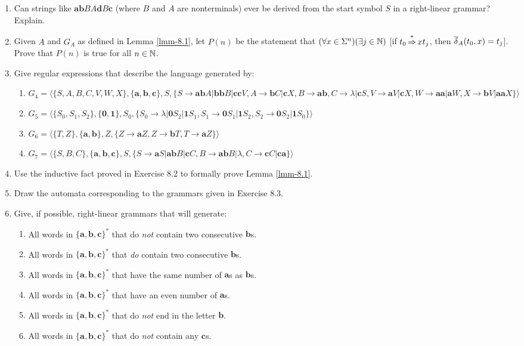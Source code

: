 \begin{enumerate}[{8.}1. ]
\item Can strings like $\pmb{ab}BA\pmb{d}B\pmb{c}$ (where $B$ and $A$ are nonterminals)
ever be derived from the start symbol $S$ in a right-linear grammar? Explain.

\item Given $A$ and $G_A$ as defined in Lemma \ref{lmm-8.1}, let $P(n)$ be the statement
that $(\forall x\in\Sigma^n)(\exists j\in\mathbb{N})$ [if $t_0\operatorname{\overset{*}{\Rightarrow}} xt_j$, then
$\overline{\delta}_A(t_0,x)=t_j$]. Prove that $P(n)$ is true for all $n\in\mathbb{N}$.

\item Give regular expressions that describe the language generated by:
\begin{enumerate}
\item $G_4 = \langle\{S,A,B,C,V,W,X\},\{\pmb{a},\pmb{b},\pmb{c}\},S,\{S
	\rightarrow\pmb{ab}A|\pmb{bb}B|\pmb{cc}V,A\rightarrow\pmb{b}C|\pmb{c}X,
	B\rightarrow\pmb{ab},C\rightarrow\lambda|\pmb{c}S,V\rightarrow\pmb{a}V|
	\pmb{c}X,W\rightarrow\pmb{aa}|\pmb{a}W,X\rightarrow\pmb{b}V|\pmb{aa}X\}
	\rangle$
\item $G_5 = \langle\{S_0,S_1,S_2\},\{\pmb{0},\pmb{1}\},S_0,\{S_0\rightarrow
	\lambda|\pmb{0}S_2|\pmb{1}S_1,S_1\rightarrow\pmb{0}S_1|\pmb{1}S_2,S_2
	\rightarrow\pmb{0}S_2|\pmb{1}S_0\}\rangle$
\item $G_6 = \langle\{T,Z\},\{\pmb{a},\pmb{b}\},Z,\{Z\rightarrow\pmb{a}Z,Z
	\rightarrow\pmb{b}T,T\rightarrow\pmb{a}Z\}\rangle$
\item $G_7 = \langle\{S,B,C\},\{\pmb{a},\pmb{b},\pmb{c}\},S,\{S\rightarrow
	\pmb{a}S|\pmb{ab}B|\pmb{c}C,B\rightarrow\pmb{ab}B|\lambda,C\rightarrow
	\pmb{c}C|\pmb{ca}\}\rangle$
\end{enumerate}

\item Use the inductive fact proved in Exercise 8.2 to formally prove Lemma
\ref{lmm-8.1}.

\item Draw the automata corresponding to the grammars given in Exercise 8.3.

\item Give, if possible, right-linear grammars that will generate:
\begin{enumerate}
\item All words in $\{\pmb{a},\pmb{b},\pmb{c}\}^*$ that do \emph{not} contain
	two consecutive $\pmb{b}$s.
\item All words in $\{\pmb{a},\pmb{b},\pmb{c}\}^*$ that \emph{do} contain two
	consecutive $\pmb{b}$s.
\item All words in $\{\pmb{a},\pmb{b},\pmb{c}\}^*$ that have the same number of
	$\pmb{a}$s as $\pmb{b}$s.
\item All words in $\{\pmb{a},\pmb{b},\pmb{c}\}^*$ that have an even number of
	$\pmb{a}$s.
\item All words in $\{\pmb{a},\pmb{b},\pmb{c}\}^*$ that do \emph{not} end in the
	letter $\pmb{b}$.
\item All words in $\{\pmb{a},\pmb{b},\pmb{c}\}^*$ that do \emph{not} contain
	any $\pmb{c}$s.
\end{enumerate}


\end{enumerate}
